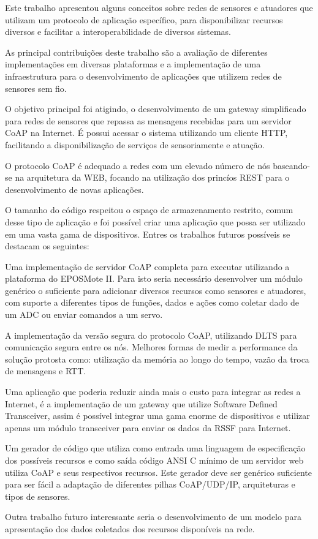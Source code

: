 Este trabalho apresentou alguns conceitos sobre redes de sensores e atuadores que utilizam um protocolo de aplica\c{c}\~ao espec\'ifico, para disponibilizar recursos diversos e facilitar a interoperabilidade de diversos sistemas.

As principal contribui\c{c}\~oes deste trabalho s\~ao a avalia\c{c}\~ao de diferentes implementa\c{c}\~oes em diversas plataformas e a implementa\c{c}\~ao de uma infraestrutura para o desenvolvimento de aplica\c{c}\~oes que utilizem redes de sensores sem fio.

O objetivo principal foi atigindo, o desenvolvimento de um gateway simplificado para redes de sensores que repassa as mensagens recebidas para um servidor CoAP na Internet. \'E possui acessar o sistema utilizando um cliente HTTP, facilitando a disponibiliza\c{c}\~ao de servi\c{c}os de sensoriamente e atua\c{c}\~ao.

O protocolo CoAP \'e adequado a redes com um elevado n\'umero de n\'os baseando-se na arquitetura da WEB, focando na utiliza\c{c}\~ao dos princ\'ios REST para o desenvolvimento de novas aplica\c{c}\~oes.

O tamanho do c\'odigo respeitou o espa\c{c}o de armazenamento restrito, comum desse tipo de aplica\c{c}\~ao e foi poss\'ivel criar uma aplica\c{c}\~ao que possa ser utilizado em uma vasta gama de dispositivos. Entres os trabalhos futuros poss\'iveis se destacam os seguintes:

Uma implementa\c{c}\~ao de servidor CoAP completa para executar utilizando a plataforma do EPOSMote II. Para isto seria necess\'ario desenvolver um m\'odulo gen\'erico o suficiente para adicionar diversos recursos como sensores e atuadores, com suporte a diferentes tipos de fun\c{c}\~oes, dados e a\c{c}\~oes como coletar dado de um ADC ou enviar comandos a um servo.

A implementa\c{c}\~ao da vers\~ao segura do protocolo CoAP, utilizando DLTS para comunica\c{c}\~ao segura entre os n\'os. Melhores formas de medir a performance da solu\c{c}\~ao protosta como: utiliza\c{c}\~ao da mem\'oria ao longo do tempo, vaz\~ao da troca de mensagens e RTT.

Uma aplica\c{c}\~ao que poderia reduzir ainda mais o custo para integrar as redes a Internet, \'e a implementa\c{c}\~ao de um gateway que utilize Software Defined Transceiver, assim \'e poss\'ivel integrar uma gama enorme de dispositivos e utilizar apenas um m\'odulo transceiver para enviar os dados da RSSF para Internet.

Um gerador de c\'odigo que utiliza como entrada uma linguagem de especifica\c{c}\~ao dos poss\'iveis recursos e como sa\'ida c\'odigo ANSI C m\'inimo de um servidor web utiliza CoAP e seus respectivos recursos. Este gerador deve ser gen\'erico suficiente para ser f\'acil a adapta\c{c}\~ao de diferentes pilhas CoAP/UDP/IP, arquiteturas e tipos de sensores.

Outra trabalho futuro interessante seria o desenvolvimento de um modelo para apresenta\c{c}\~ao dos dados coletados dos recursos dispon\'iveis na rede.
